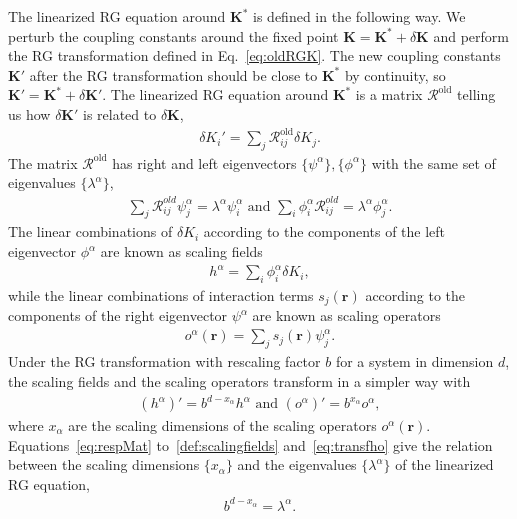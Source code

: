 \documentclass[aps,prr,reprint,superscriptaddress,nofootinbib,floatfix]{revtex4-2}
\begin{document}
The linearized RG equation around $\mathbf{K}^{*}$ is defined in the following way.
We perturb the coupling constants around the fixed point $\mathbf{K} = \mathbf{K}^{*} + \delta \mathbf{K}$ and perform the RG transformation defined in Eq.~\eqref{eq:oldRGK}. 
The new coupling constants $\mathbf{K}'$ after the RG transformation should be close to $\mathbf{K}^{*}$ by continuity, so $\mathbf{K}' = \mathbf{K}^{*} + \delta \mathbf{K}'$.
The linearized RG equation around $\mathbf{K}^{*}$ is a matrix $\mathcal{R}^{\text{old}}$ telling us how $\delta \mathbf{K}'$ is related to $\delta \mathbf{K}$,
%
\begin{align}\label{eq:respMat}
    \delta K_i' = \sum_j\mathcal{R}^{\text{old}}_{ij} \delta K_j.
\end{align}
%
The matrix $\mathcal{R}^{\text{old}}$ has right and left eigenvectors $\{\psi^{\alpha}\}, \{\phi^{\alpha}\}$ with the same set of eigenvalues $\{\lambda^{\alpha}\}$,
%
\begin{align}\label{eq:eigsofRespM}
    \sum_j \mathcal{R}^{old}_{ij} \psi^{\alpha}_j = \lambda^{\alpha}
    \psi^{\alpha}_i \text{ and } \sum_i \phi^{\alpha}_i
    \mathcal{R}^{old}_{ij} = \lambda^{\alpha} \phi^{\alpha}_j.
\end{align}
%
The linear combinations of $\delta K_i$ according to the components of the left eigenvector $\phi^{\alpha}$ are known as scaling fields
%
\begin{align}\label{def:scalingfields}
    h^{\alpha} = \sum_i \phi^{\alpha}_i \delta K_i,
\end{align}
%
while the linear combinations of interaction terms $s_j(\mathbf{r})$ according to the components of the right eigenvector $\psi^{\alpha}$ are known as scaling operators
%
\begin{align}\label{def:scalingOpt}
    o^{\alpha}(\mathbf{r}) = \sum_j s_j(\mathbf{r}) \psi^{\alpha}_j.
\end{align}
%
Under the RG transformation with rescaling factor $b$ for a system in dimension $d$, the scaling fields and the scaling operators transform in a simpler way with 
%
\begin{align}\label{eq:transfho}
    \left(h^{\alpha} \right)' = b^{d - x_{\alpha}} h^{\alpha} \text{ and }
    \left(o^{\alpha}\right)' = b^{x_{\alpha}} o^{\alpha},
\end{align}
where $x_{\alpha}$ are the scaling dimensions of the scaling operators $o^{\alpha}(\mathbf{r})$. 
Equations~\eqref{eq:respMat} to~\eqref{def:scalingfields} and~\eqref{eq:transfho} give the relation between the scaling dimensions $\{x_{\alpha}\}$ and the eigenvalues $\{\lambda^{\alpha}\}$ of the linearized RG equation, 
%
\begin{align}\label{eq:lambda2x}
    b^{d-x_{\alpha}} = \lambda^{\alpha}.
\end{align}
%
\end{document}
